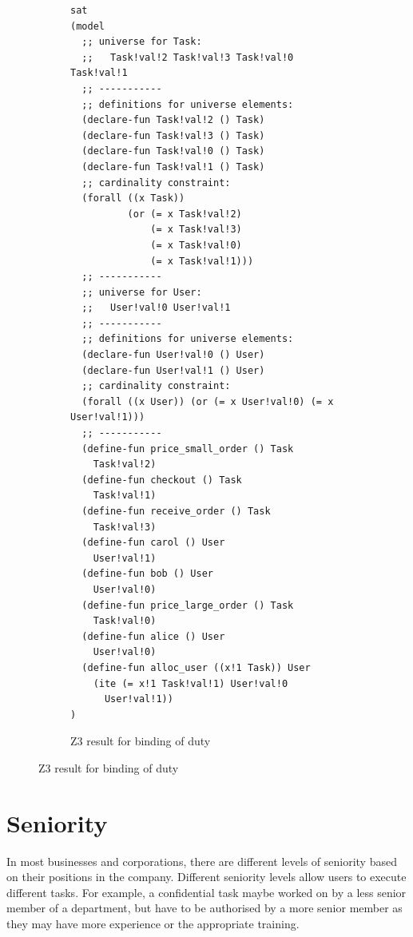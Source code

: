 \documentclass[a4paper]{report}
\begin{document}
\begin{figure}[!h]
\ContinuedFloat
\begin{subfigure}{\textwidth}
\lstset{numbers=none, showspaces=false,
    showstringspaces=false, tabsize=2, breaklines=true,
    xleftmargin=5.0ex,
}
\begin{lstlisting}[frame=single]
sat
(model 
  ;; universe for Task:
  ;;   Task!val!2 Task!val!3 Task!val!0 Task!val!1 
  ;; -----------
  ;; definitions for universe elements:
  (declare-fun Task!val!2 () Task)
  (declare-fun Task!val!3 () Task)
  (declare-fun Task!val!0 () Task)
  (declare-fun Task!val!1 () Task)
  ;; cardinality constraint:
  (forall ((x Task))
          (or (= x Task!val!2)
              (= x Task!val!3)
              (= x Task!val!0)
              (= x Task!val!1)))
  ;; -----------
  ;; universe for User:
  ;;   User!val!0 User!val!1 
  ;; -----------
  ;; definitions for universe elements:
  (declare-fun User!val!0 () User)
  (declare-fun User!val!1 () User)
  ;; cardinality constraint:
  (forall ((x User)) (or (= x User!val!0) (= x User!val!1)))
  ;; -----------
  (define-fun price_small_order () Task
    Task!val!2)
  (define-fun checkout () Task
    Task!val!1)
  (define-fun receive_order () Task
    Task!val!3)
  (define-fun carol () User
    User!val!1)
  (define-fun bob () User
    User!val!0)
  (define-fun price_large_order () Task
    Task!val!0)
  (define-fun alice () User
    User!val!0)
  (define-fun alloc_user ((x!1 Task)) User
    (ite (= x!1 Task!val!1) User!val!0
      User!val!1))
)
\end{lstlisting}
\caption{Z3 result for binding of duty}
\label{fig:Z3 result for binding of duty}
\end{subfigure}
\end{figure}

\section{Seniority}
In most businesses and corporations, there are different levels of seniority based on their positions in the company. Different seniority levels allow users to execute different tasks. For example, a confidential task maybe worked on by a less senior member of a department, but have to be authorised by a more senior member as they may have more experience or the appropriate training\cite{seniority}.\\
\end{document}
